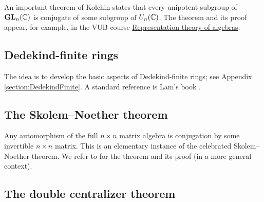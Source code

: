 An important theorem of Kolchin states that 
every unipotent subgroup of $\mathbf{GL}_n(\mathbb{C})$ is conjugate
of some subgroup of $U_n(\mathbb{C})$. The theorem and its proof 
appear, for example, 
in the 
VUB course \href{https://github.com/vendramin/representation}{Representation theory of algebras}.

\subsection*{Dedekind-finite rings}

The idea is to develop the basic aspects of Dedekind-finite rings; see Appendix \ref{section:DedekindFinite}. 
A standard reference is Lam's book \cite{MR2278849}. 








\subsection*{The Skolem--Noether theorem}

Any automorphism of the full $n\times n$ matrix algebra 
is conjugation by some invertible $n\times n$ matrix. This is an elementary 
instance of the celebrated Skolem--Noether theorem. We refer to 
\cite[Chapter 4]{MR3308118} for the theorem 
and its proof (in a more general context).

\subsection*{The double centralizer theorem}

